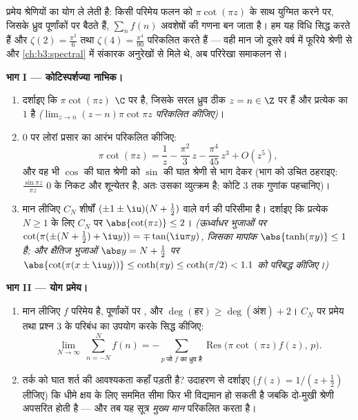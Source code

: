 \begin{problem}\label{pb:b3:residues:1}
 प्रमेय श्रेणियों का योग ले लेती है: किसी परिमेय फलन को
$\pi\cot(\pi z)$ के साथ युग्मित करने पर, जिसके ध्रुव पूर्णांकों पर बैठते हैं,
$\sum_{n}f(n)$ अवशेषों की गणना बन जाता है। हम यह विधि सिद्ध करते हैं और
$\zeta(2) = \frac{\pi^2}{6}$ तथा $\zeta(4) =
\frac{\pi^4}{90}$ परिकलित करते हैं --- वही मान जो दूसरे वर्ष में
फूरिये श्रेणी से और \cref{ch:b3:spectral} में संकारक अनुरेखों से मिले थे, अब
परिरेखा समाकलन से।

\medskip
\noindent\textbf{भाग I --- कोटिस्पर्शज्या नाभिक।}
\begin{enumerate}
  \item दर्शाइए कि $\pi\cot(\pi z)$ $\C$ पर  है, जिसके सरल ध्रुव
        ठीक $z = n \in \Z$ पर हैं और प्रत्येक का  $1$ है
        \emph{($\lim_{z\to n}(z-n)\pi\cot\pi z$ परिकलित कीजिए)}।
  \item $0$ पर लोरां प्रसार का आरंभ परिकलित कीजिए:
        \[
        \pi\cot(\pi z) = \frac1z - \frac{\pi^2}{3}\,z -
        \frac{\pi^4}{45}\,z^3 + O(z^5) ,
        \]
        और वह भी $\cos$ की घात श्रेणी को $\sin$ की घात श्रेणी से
        भाग देकर (भाग को उचित ठहराइए: $\frac{\sin\pi z}{\pi z}$ $0$ के निकट
         और शून्येतर है, अतः उसका व्युत्क्रम
         है; कोटि $3$ तक गुणांक पहचानिए)।
  \item मान लीजिए $C_N$ शीर्षों $(\pm1\pm\iu)(N + \frac12)$ वाले वर्ग की परिसीमा है।
        दर्शाइए कि प्रत्येक $N \geq
        1$ के लिए $C_N$ पर $\abs{\cot(\pi z)} \leq 2$।
        \emph{(ऊर्ध्वाधर भुजाओं पर $\cot(\pi(\pm(N +
        \frac12) + \iu y)) = \mp\tan(\iu\pi y)$, जिसका मापांक $\abs{\tanh(\pi y)} \leq 1$ है;
        और क्षैतिज भुजाओं $\abs y = N + \frac12$ पर $\abs{\cot(\pi(x\pm\iu y))} \leq \coth(\pi y) \leq
        \coth(\pi/2) < 1.1$ को परिबद्ध कीजिए।)}
\end{enumerate}

\medskip
\noindent\textbf{भाग II --- योग प्रमेय।}
\begin{enumerate}[resume]
  \item मान लीजिए $f$ परिमेय है, पूर्णांकों पर , और
        $\deg(\text{हर}) \geq \deg(\text{अंश}) + 2$। $C_N$ पर  प्रमेय तथा प्रश्न 3 के परिबंध का
        उपयोग करके सिद्ध कीजिए:
        \[
        \lim_{N\to\infty}\ \sum_{n = -N}^{N} f(n)
        = -\sum_{p\ \text{जो } f \text{ का ध्रुव है}}
        \operatorname{Res}\bigl(\pi\cot(\pi z)f(z),\,p\bigr).
        \]
  \item तर्क को घात शर्त की आवश्यकता कहाँ पड़ती है? उदाहरण से
        दर्शाइए ($f(z) = 1/(z + \frac12)$ लीजिए) कि धीमे क्षय के लिए सममित सीमा फिर
        भी विद्यमान हो सकती है जबकि दो-मुखी श्रेणी अपसरित होती है
        --- और तब यह सूत्र \emph{मुख्य मान} परिकलित करता है।
\end{enumerate}


\end{problem}
